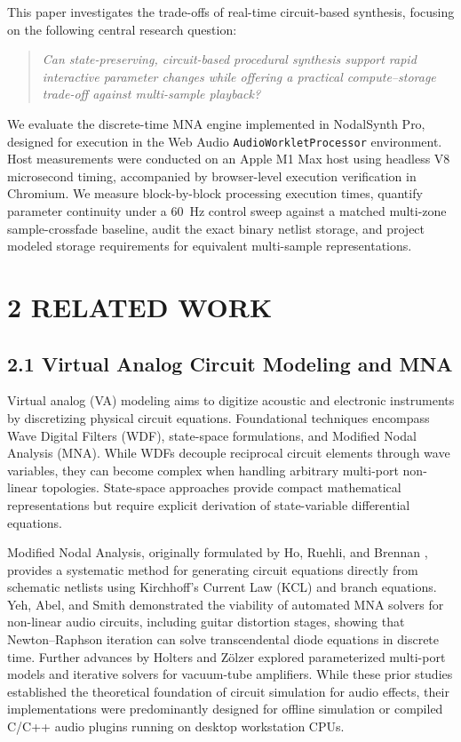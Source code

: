 \documentclass[fleqn,draft]{jaes}
\begin{document}
This paper investigates the trade-offs of real-time circuit-based synthesis, focusing on the following central research question:
\begin{quote}
\textit{Can state-preserving, circuit-based procedural synthesis support rapid interactive parameter changes while offering a practical compute--storage trade-off against multi-sample playback?}
\end{quote}

We evaluate the discrete-time MNA engine implemented in NodalSynth Pro, designed for execution in the Web Audio \texttt{AudioWorkletProcessor} environment. Host measurements were conducted on an Apple M1 Max host using headless V8 microsecond timing, accompanied by browser-level execution verification in Chromium. We measure block-by-block processing execution times, quantify parameter continuity under a 60~Hz control sweep against a matched multi-zone sample-crossfade baseline, audit the exact binary netlist storage, and project modeled storage requirements for equivalent multi-sample representations.

\section{2 RELATED WORK}

\subsection{2.1 Virtual Analog Circuit Modeling and MNA}
Virtual analog (VA) modeling aims to digitize acoustic and electronic instruments by discretizing physical circuit equations. Foundational techniques encompass Wave Digital Filters (WDF), state-space formulations, and Modified Nodal Analysis (MNA). While WDFs \cite{fettweis1986wave, smith2010physical} decouple reciprocal circuit elements through wave variables, they can become complex when handling arbitrary multi-port non-linear topologies. State-space approaches \cite{bilbao2009numerical, valimaki2006discrete} provide compact mathematical representations but require explicit derivation of state-variable differential equations.

Modified Nodal Analysis, originally formulated by Ho, Ruehli, and Brennan \cite{ho1975modified}, provides a systematic method for generating circuit equations directly from schematic netlists using Kirchhoff's Current Law (KCL) and branch equations. Yeh, Abel, and Smith \cite{yeh2007automated, yeh2009automated} demonstrated the viability of automated MNA solvers for non-linear audio circuits, including guitar distortion stages, showing that Newton--Raphson iteration can solve transcendental diode equations in discrete time. Further advances by Holters and Z\"olzer \cite{holters2011physical, holters2015combined} explored parameterized multi-port models and iterative solvers for vacuum-tube amplifiers. While these prior studies established the theoretical foundation of circuit simulation for audio effects, their implementations were predominantly designed for offline simulation or compiled C/C++ audio plugins running on desktop workstation CPUs.
\end{document}
